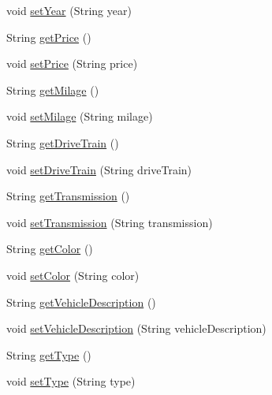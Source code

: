 \begin{DoxyCompactItemize}
void \mbox{\hyperlink{classobjects_1_1_vehicle_a40c1dc146931158d6f525730ee16be29}{set\+Year}} (String year)
\item 
String \mbox{\hyperlink{classobjects_1_1_vehicle_af95e90045655c94d7deb20c4f4a39e3b}{get\+Price}} ()
\item 
void \mbox{\hyperlink{classobjects_1_1_vehicle_addc55186979236313365711248dfbd3a}{set\+Price}} (String price)
\item 
String \mbox{\hyperlink{classobjects_1_1_vehicle_aef0a9472bab0331015a34cf9b80c03d9}{get\+Milage}} ()
\item 
void \mbox{\hyperlink{classobjects_1_1_vehicle_aea5e8eca8d1de670e53c33dabc42b877}{set\+Milage}} (String milage)
\item 
String \mbox{\hyperlink{classobjects_1_1_vehicle_a1695d376c5a081e9ce6e06455dc6375b}{get\+Drive\+Train}} ()
\item 
void \mbox{\hyperlink{classobjects_1_1_vehicle_af1a360d6d0d55201647ea700649fbe8e}{set\+Drive\+Train}} (String drive\+Train)
\item 
String \mbox{\hyperlink{classobjects_1_1_vehicle_a549e7e76185dc23d9c818287bcad3384}{get\+Transmission}} ()
\item 
void \mbox{\hyperlink{classobjects_1_1_vehicle_a46df4157f61a01a7f10f5e63379ec9ab}{set\+Transmission}} (String transmission)
\item 
String \mbox{\hyperlink{classobjects_1_1_vehicle_a0c2cca75bbfd0040bd8b25688e5e7333}{get\+Color}} ()
\item 
void \mbox{\hyperlink{classobjects_1_1_vehicle_a252cad922969a207043e7cb49db241fa}{set\+Color}} (String color)
\item 
String \mbox{\hyperlink{classobjects_1_1_vehicle_a08dfda8d36f4b5974d5cfd569930c8ef}{get\+Vehicle\+Description}} ()
\item 
void \mbox{\hyperlink{classobjects_1_1_vehicle_a1bccfae077033ebb25e11c592dfc81b4}{set\+Vehicle\+Description}} (String vehicle\+Description)
\item 
String \mbox{\hyperlink{classobjects_1_1_vehicle_aced89dd649b4c83ad6932339c7ac3d3c}{get\+Type}} ()
\item 
void \mbox{\hyperlink{classobjects_1_1_vehicle_a8e58c1d0bc06335155fbe8d725772967}{set\+Type}} (String type)
\end{DoxyCompactItemize}
